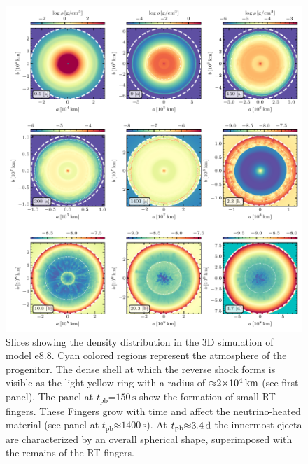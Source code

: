 \documentclass[fleqn,usenatbib]{mnras}
\newcommand{\tpb}{\ensuremath{t_{\text{pb}}}}
\newcommand{\s}{\ensuremath{\text{s}}}
\newcommand{\onemg}{\ensuremath{\mathrm{e8.8}}\xspace}
\begin{document}
\begin{figure}%
\includegraphics[width=\textwidth]{pic/e8_3d_3x3_den.pdf}
    \caption{Slices showing the density distribution
    in the 3D simulation of model \onemg. Cyan colored regions represent the atmosphere of the progenitor.  The dense shell at which the reverse shock 
    forms is visible as the light yellow ring with a radius of $\mathord{\approx} 2\mathord{\times}10^4\,\rm km$
    (see first panel).
    The panel at $\tpb\mathord{=}150\,\s$ show the formation of small RT fingers.
    These Fingers grow with time and affect the neutrino-heated material (see panel at
    $\tpb\mathord{\approx}1400 \, \s$).
    At $\tpb\mathord{\approx}3.4\,\rm d$ the innermost ejecta are characterized by an overall
    spherical shape, superimposed with the remains of the RT fingers.}
\label{fig:e8 rho cuts}
\end{figure}%
\end{document}
